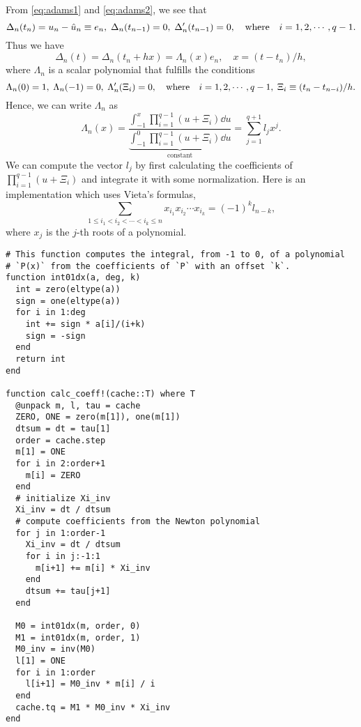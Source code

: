 \documentclass[11pt,a4paper]{article}
\begin{document}
From \cref{eq:adams1} and \cref{eq:adams2}, we see that
\begin{equation}
  \Delta_n(t_n) = u_n - \hat{u}_n \equiv e_n,\; \Delta_n(t_{n-1}) = 0,\;
  \Delta'_n(t_{n-1}) = 0, \qq{where} i=1,2,\cdots,q-1.
\end{equation}
Thus we have
\begin{equation}
  \Delta_n(t) = \Delta_n(t_n+hx) = \Lambda_n(x)e_n, \quad x = (t-t_n)/h,
\end{equation}
where $\Lambda_n$ is a scalar polynomial that fulfills the conditions
\begin{equation}
  \Lambda_n(0)=1,\; \Lambda_n(-1) = 0,\; \Lambda'_n(\Xi_i) = 0,\qq{where}
  i=1,2,\cdots,q-1,\; \Xi_i \equiv (t_n-t_{n-i})/h.
\end{equation}
Hence, we can write $\Lambda_n$ as
\begin{equation}
  \Lambda_n(x) = \frac{\int_{-1}^x\prod_{i=1}^{q-1} (u+\Xi_i) \dd{u}}
          {\underbrace{\int_{-1}^0\prod_{i=1}^{q-1} (u+\Xi_i)
          \dd{u}}_\text{constant}}
               = \sum_{j=1}^{q+1} l_jx^j.
\end{equation}
We can compute the vector $l_j$ by first calculating the coefficients of
$\prod_{i=1}^{q-1} (u+\Xi_i)$ and integrate it with some normalization. Here is
an implementation which uses Vieta's formulas,
\begin{equation}
  \sum_{1\leq i_{1}<i_{2}<\cdots <i_{k}\leq n}x_{i_{1}}x_{i_{2}}\cdots
  x_{i_{k}}=(-1)^{k}l_{n-k},
\end{equation}
where $x_j$ is the $j$-th roots of a polynomial.
\begin{lstlisting}
# This function computes the integral, from -1 to 0, of a polynomial
# `P(x)` from the coefficients of `P` with an offset `k`.
function int01dx(a, deg, k)
  int = zero(eltype(a))
  sign = one(eltype(a))
  for i in 1:deg
    int += sign * a[i]/(i+k)
    sign = -sign
  end
  return int
end

function calc_coeff!(cache::T) where T
  @unpack m, l, tau = cache
  ZERO, ONE = zero(m[1]), one(m[1])
  dtsum = dt = tau[1]
  order = cache.step
  m[1] = ONE
  for i in 2:order+1
    m[i] = ZERO
  end
  # initialize Xi_inv
  Xi_inv = dt / dtsum
  # compute coefficients from the Newton polynomial
  for j in 1:order-1
    Xi_inv = dt / dtsum
    for i in j:-1:1
      m[i+1] += m[i] * Xi_inv
    end
    dtsum += tau[j+1]
  end

  M0 = int01dx(m, order, 0)
  M1 = int01dx(m, order, 1)
  M0_inv = inv(M0)
  l[1] = ONE
  for i in 1:order
    l[i+1] = M0_inv * m[i] / i
  end
  cache.tq = M1 * M0_inv * Xi_inv
end
\end{lstlisting}
\end{document}
